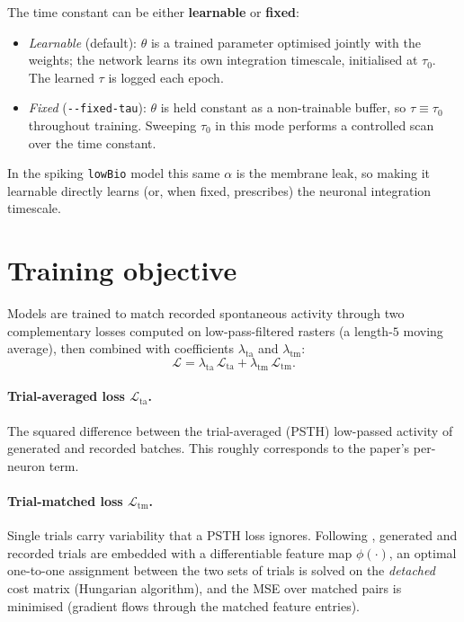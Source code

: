 \documentclass[11pt]{article}
\newcommand{\code}[1]{\texttt{#1}}
\begin{document}
The time constant can be either \textbf{learnable} or \textbf{fixed}:
\begin{itemize}[leftmargin=1.6em]
\item \emph{Learnable} (default): $\theta$ is a trained parameter optimised
jointly with the weights; the network learns its own integration timescale,
initialised at $\tau_0$. The learned $\tau$ is logged each epoch.
\item \emph{Fixed} (\code{-{}-fixed-tau}): $\theta$ is held constant as a
non-trainable buffer, so $\tau \equiv \tau_0$ throughout training. Sweeping
$\tau_0$ in this mode performs a controlled scan over the time constant.
\end{itemize}
In the spiking \code{lowBio} model this same $\alpha$ is the membrane leak, so
making it learnable directly learns (or, when fixed, prescribes) the neuronal
integration timescale.

\section{Training objective}
\label{sec:loss}
Models are trained to match recorded spontaneous activity through two
complementary losses computed on low-pass-filtered rasters (a length-$5$ moving
average), then combined with coefficients $\lambda_{\mathrm{ta}}$ and
$\lambda_{\mathrm{tm}}$:
\begin{equation}
\mathcal{L} = \lambda_{\mathrm{ta}}\,\mathcal{L}_{\mathrm{ta}}
            + \lambda_{\mathrm{tm}}\,\mathcal{L}_{\mathrm{tm}}.
\end{equation}

\paragraph{Trial-averaged loss $\mathcal{L}_{\mathrm{ta}}$.} The squared
difference between the trial-averaged (PSTH) low-passed activity of generated and
recorded batches. This roughly corresponds to the paper's per-neuron term.

\paragraph{Trial-matched loss $\mathcal{L}_{\mathrm{tm}}$.} Single trials carry
variability that a PSTH loss ignores. Following \cite{sourmpis2023}, generated
and recorded trials are embedded with a differentiable feature map
$\phi(\cdot)$, an optimal one-to-one assignment between the two sets of trials is
solved on the \emph{detached} cost matrix (Hungarian algorithm), and the MSE over
matched pairs is minimised (gradient flows through the matched feature entries).
\end{document}
